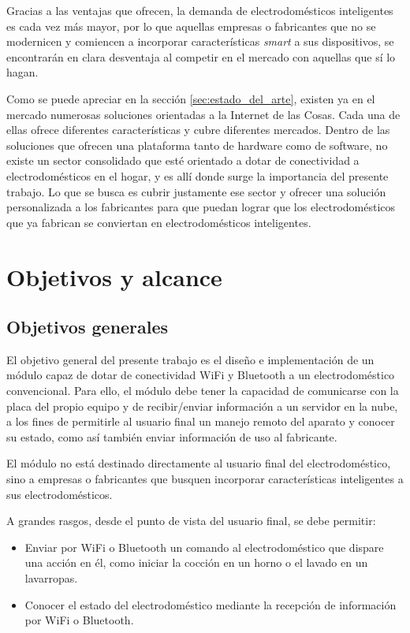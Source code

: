Gracias a las ventajas que ofrecen, la demanda de electrodomésticos inteligentes es cada vez más mayor, por lo que aquellas empresas o fabricantes que no se modernicen y comiencen a incorporar características \emph{smart} a sus dispositivos, se encontrarán en clara desventaja
al competir en el mercado con aquellas que sí lo hagan.

Como se puede apreciar en la sección \ref{sec:estado_del_arte}, existen ya en el mercado numerosas soluciones orientadas a la Internet de las Cosas. Cada una de ellas ofrece diferentes características y cubre diferentes mercados. Dentro de las soluciones que ofrecen una plataforma tanto de hardware como de software, no existe un sector consolidado que esté orientado a dotar de conectividad a electrodomésticos en el hogar, y es allí donde surge la importancia del presente trabajo. Lo que se busca es cubrir justamente ese sector y ofrecer una solución personalizada a los fabricantes para que puedan lograr que los electrodomésticos que ya fabrican se conviertan en electrodomésticos inteligentes.


\section{Objetivos y alcance{}}

\subsection{Objetivos generales}

El objetivo general del presente trabajo es el diseño e implementación de un módulo capaz de dotar de conectividad WiFi y Bluetooth a un electrodoméstico convencional. Para ello, el módulo debe tener la capacidad de comunicarse con la placa del propio equipo y de recibir/enviar información a un servidor en la nube, a los fines de permitirle al usuario final un manejo remoto del aparato y conocer su estado, como así también enviar información de uso al fabricante. 

El módulo no está destinado directamente al usuario final del electrodoméstico, sino a empresas o fabricantes que busquen incorporar características inteligentes a sus electrodomésticos.

A grandes rasgos, desde el punto de vista del usuario final, se debe permitir:
\begin{itemize}
	\item Enviar por WiFi o Bluetooth un comando al electrodoméstico que dispare una acción en él, como iniciar la cocción en un horno o el lavado en un lavarropas.
	\item Conocer el estado del electrodoméstico mediante la recepción de información por WiFi o Bluetooth.
\end{itemize}

